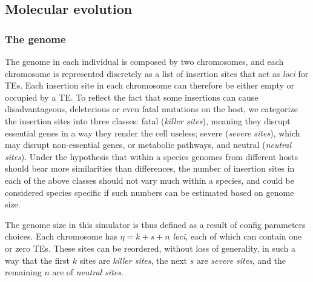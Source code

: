 \documentclass[10pt]{article}
\begin{document}

\subsection{Molecular evolution}

\subsubsection{The genome}

The genome in each individual is composed by two chromosomes, and each
chromosome is represented discretely as a list of insertion sites that
act as \emph{loci} for TEs. Each insertion site in each chromosome can
therefore be either empty or occupied by a TE. To reflect the fact
that some insertions can cause disadvantageous, deleterious or even
fatal mutations on the host, we categorize the insertion sites into
three classes: fatal (\emph{killer sites}), meaning they disrupt
essential genes in a way they render the cell useless; severe
(\emph{severe sites}), which may disrupt non-essential genes, or
metabolic pathways, and neutral (\emph{neutral sites}). Under the
hypothesis that within a species genomes from different hosts should
bear more similarities than differences, the number of insertion sites
in each of the above classes should not vary much within a species,
and could be considered species specific if such numbers can be
estimated based on genome size.

The genome size in this simulator is thus defined as a result of
config parameters choices. Each chromosome has $\eta = k + s + n$
\emph{loci}, each of which can contain one or zero TEs. These sites
can be reordered, without loss of generality, in such a way that the
first $k$ sites are \emph{killer sites}, the next $s$ are \emph{severe
  sites}, and the remaining $n$ are of \emph{neutral sites}.


\end{document}
